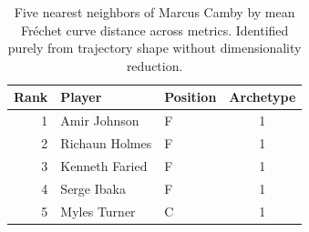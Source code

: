 \begin{table}[htbp]
  \centering\small
  \begin{tabular}{rllc}
    \toprule
    Rank & Player & Position & Archetype \\
    \midrule
    1 & Amir Johnson & F & 1 \\
    2 & Richaun Holmes & F & 1 \\
    3 & Kenneth Faried & F & 1 \\
    4 & Serge Ibaka & F & 1 \\
    5 & Myles Turner & C & 1 \\
    \bottomrule
  \end{tabular}
  \caption{Five nearest neighbors of Marcus Camby by mean Fr\'{e}chet curve distance across metrics. Identified purely from trajectory shape without dimensionality reduction.}
  \label{tab:Marcus_Camby_frechet_curve_neighbors}
\end{table}

